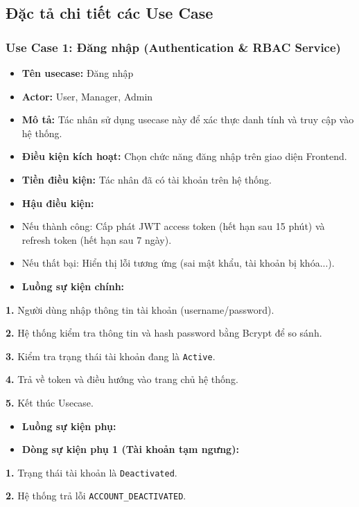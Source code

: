 \documentclass[12pt,a4paper]{report}
\begin{document}
\subsection{Đặc tả chi tiết các Use Case}

\subsubsection{Use Case 1: Đăng nhập (Authentication \& RBAC Service)}
\begin{itemize}
    \item \textbf{Tên usecase:} Đăng nhập
    \item \textbf{Actor:} User, Manager, Admin
    \item \textbf{Mô tả:} Tác nhân sử dụng usecase này để xác thực danh tính và truy cập vào hệ thống.
    \item \textbf{Điều kiện kích hoạt:} Chọn chức năng đăng nhập trên giao diện Frontend.
    \item \textbf{Tiền điều kiện:} Tác nhân đã có tài khoản trên hệ thống.
    \item \textbf{Hậu điều kiện:}
    \item Nếu thành công: Cấp phát JWT access token (hết hạn sau 15 phút) và refresh token (hết hạn sau 7 ngày).
    \item Nếu thất bại: Hiển thị lỗi tương ứng (sai mật khẩu, tài khoản bị khóa...).
    \item \textbf{Luồng sự kiện chính:}
\end{itemize}

\textbf{1.} Người dùng nhập thông tin tài khoản (username/password).


\textbf{2.} Hệ thống kiểm tra thông tin và hash password bằng Bcrypt để so sánh.


\textbf{3.} Kiểm tra trạng thái tài khoản đang là \texttt{Active}.


\textbf{4.} Trả về token và điều hướng vào trang chủ hệ thống.


\textbf{5.} Kết thúc Usecase.

\begin{itemize}
    \item \textbf{Luồng sự kiện phụ:}
    \item \textbf{Dòng sự kiện phụ 1 (Tài khoản tạm ngưng):}
\end{itemize}

\textbf{1.} Trạng thái tài khoản là \texttt{Deactivated}.


\textbf{2.} Hệ thống trả lỗi \texttt{ACCOUNT\_DEACTIVATED}.
\end{document}
